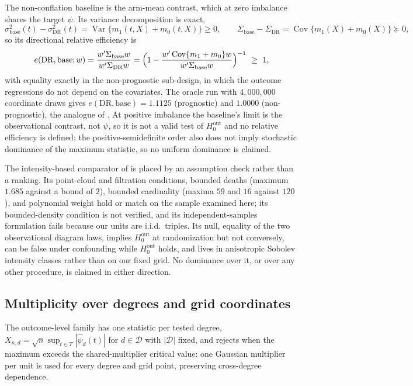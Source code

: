 The non-conflation baseline is the arm-mean contrast, which at zero imbalance shares the target $\psi$. Its variance decomposition is exact,
\[
\sigma^2_{\mathrm{base}}(t)-\sigma^2_{\mathrm{DR}}(t)=\operatorname{Var}\{m_1(t,X)+m_0(t,X)\}\ge0,\qquad
\Sigma_{\mathrm{base}}-\Sigma_{\mathrm{DR}}=\operatorname{Cov}\{m_1(X)+m_0(X)\}\succeq0,
\]
so its directional relative efficiency is
\[
e(\mathrm{DR},\mathrm{base};w)=\frac{w'\Sigma_{\mathrm{base}}w}{w'\Sigma_{\mathrm{DR}}w}
=\Bigl(1-\frac{w'\operatorname{Cov}\{m_1+m_0\}w}{w'\Sigma_{\mathrm{base}}w}\Bigr)^{-1}\ \ge\ 1,
\]
with equality exactly in the non-prognostic sub-design, in which the outcome regressions do not depend on the covariates. The oracle run with $4{,}000{,}000$ coordinate draws gives $e(\mathrm{DR},\mathrm{base})=1.1125$ (prognostic) and $1.0000$ (non-prognostic), the analogue of \citet{lin_2013}. At positive imbalance the baseline's limit is the observational contrast, not $\psi$, so it is not a valid test of $H_0^{\mathrm{out}}$ and no relative efficiency is defined; the positive-semidefinite order also does not imply stochastic dominance of the maximum statistic, so no uniform dominance is claimed.

The intensity-based comparator of \citet{han_kim_kim_2026} is placed by an assumption check rather than a ranking. Its point-cloud and filtration conditions, bounded deaths (maximum $1.685$ against a bound of $2$), bounded cardinality (maxima $59$ and $16$ against $120$), and polynomial weight hold or match on the sample examined here; its bounded-density condition is not verified, and its independent-samples formulation fails because our units are i.i.d.\ triples. Its null, equality of the two observational diagram laws, implies $H_0^{\mathrm{out}}$ at randomization but not conversely, can be false under confounding while $H_0^{\mathrm{out}}$ holds, and lives in anisotropic Sobolev intensity classes rather than on our fixed grid. No dominance over it, or over any other procedure, is claimed in either direction.

\subsection{Multiplicity over degrees and grid coordinates}
\label{subsec:multiplicity}

The outcome-level family has one statistic per tested degree, $X_{n,d}=\sqrt n\sup_{t\in T}|\hat\psi_d(t)|$ for $d\in\mathcal D$ with $|\mathcal D|$ fixed, and rejects when the maximum exceeds the shared-multiplier critical value: one Gaussian multiplier per unit is used for every degree and grid point, preserving cross-degree dependence.

